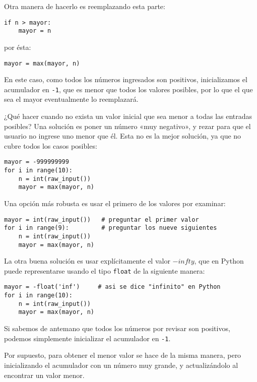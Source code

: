 Otra manera de hacerlo es reemplazando esta parte:

\begin{lstlisting}
if n > mayor:
    mayor = n
\end{lstlisting}

por ésta:

\begin{lstlisting}
mayor = max(mayor, n)
\end{lstlisting}

En este caso, como todos los números ingresados son positivos,
inicializamos el acumulador en \lstinline!-1!, que es menor que todos
los valores posibles, por lo que el que sea el mayor eventualmente lo
reemplazará.

¿Qué hacer cuando no exista un valor inicial que sea menor a todas las
entradas posibles? Una solución es poner un número «muy negativo», y
rezar para que el usuario no ingrese uno menor que él. Esta no es la
mejor solución, ya que no cubre todos los casos posibles:

\begin{lstlisting}
mayor = -999999999
for i in range(10):
    n = int(raw_input())
    mayor = max(mayor, n)
\end{lstlisting}

Una opción más robusta es usar el primero de los valores por examinar:

\begin{lstlisting}
mayor = int(raw_input())   # preguntar el primer valor
for i in range(9):         # preguntar los nueve siguientes
    n = int(raw_input())
    mayor = max(mayor, n)
\end{lstlisting}

La otra buena solución es usar explícitamente el valor \(-infty\), que en
Python puede representarse usando el tipo \lstinline!float! de la
siguiente manera:

\begin{lstlisting}
mayor = -float('inf')     # asi se dice "infinito" en Python
for i in range(10):
    n = int(raw_input())
    mayor = max(mayor, n)
\end{lstlisting}

Si sabemos de antemano que todos los números por revisar son positivos,
podemos simplemente inicializar el acumulador en \lstinline!-1!.

Por supuesto, para obtener el menor valor se hace de la misma manera,
pero inicializando el acumulador con un número muy grande, y
actualizándolo al encontrar un valor menor.

